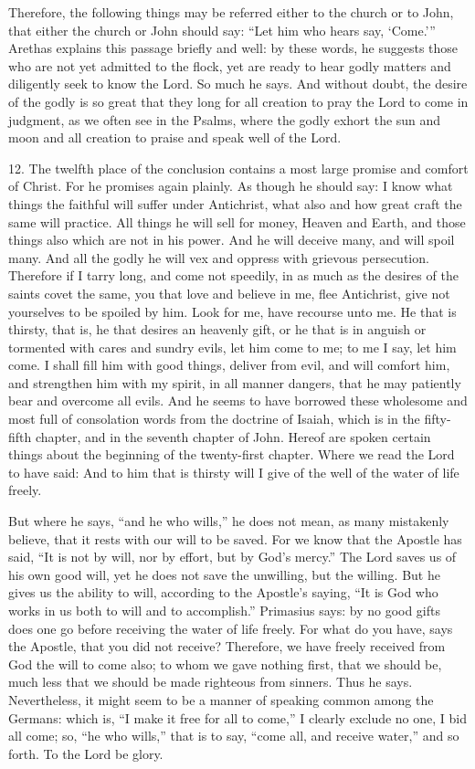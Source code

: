 Therefore, the following things may be referred either to the church or to John, that either the church or John should say: “Let him who hears say, ‘Come.’” Arethas explains this passage briefly and well: by these words, he suggests those who are not yet admitted to the flock, yet are ready to hear godly matters and diligently seek to know the Lord. So much he says. And without doubt, the desire of the godly is so great that they long for all creation to pray the Lord to come in judgment, as we often see in the Psalms, where the godly exhort the sun and moon and all creation to praise and speak well of the Lord.

12. The twelfth place of the conclusion contains a most large promise and comfort of Christ. For he promises again plainly. As though he should say: I know what things the faithful will suffer under Antichrist, what also and how great craft the same will practice. All things he will sell for money, Heaven and Earth, and those things also which are not in his power. And he will deceive many, and will spoil many. And all the godly he will vex and oppress with grievous persecution. Therefore if I tarry long, and come not speedily, in as much as the desires of the saints covet the same, you that love and believe in me, flee Antichrist, give not yourselves to be spoiled by him. Look for me, have recourse unto me. He that is thirsty, that is, he that desires an heavenly gift, or he that is in anguish or tormented with cares and sundry evils, let him come to me; to me I say, let him come. I shall fill him with good things, deliver from evil, and will comfort him, and strengthen him with my spirit, in all manner dangers, that he may patiently bear and overcome all evils. And he seems to have borrowed these wholesome and most full of consolation words from the doctrine of Isaiah, which is in the fifty-fifth chapter, and in the seventh chapter of John. Hereof are spoken certain things about the beginning of the twenty-first chapter. Where we read the Lord to have said: And to him that is thirsty will I give of the well of the water of life freely.

But where he says, “and he who wills,” he does not mean, as many mistakenly believe, that it rests with our will to be saved. For we know that the Apostle has said, “It is not by will, nor by effort, but by God’s mercy.” The Lord saves us of his own good will, yet he does not save the unwilling, but the willing. But he gives us the ability to will, according to the Apostle’s saying, “It is God who works in us both to will and to accomplish.” Primasius says: by no good gifts does one go before receiving the water of life freely. For what do you have, says the Apostle, that you did not receive? Therefore, we have freely received from God the will to come also; to whom we gave nothing first, that we should be, much less that we should be made righteous from sinners. Thus he says. Nevertheless, it might seem to be a manner of speaking common among the Germans: which is, “I make it free for all to come,” I clearly exclude no one, I bid all come; so, “he who wills,” that is to say, “come all, and receive water,” and so forth. To the Lord be glory.
